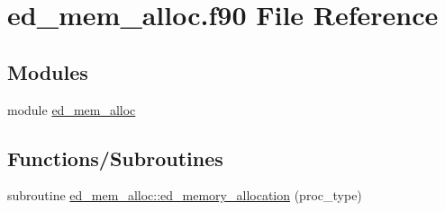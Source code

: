 \hypertarget{ed__mem__alloc_8f90}{}\section{ed\+\_\+mem\+\_\+alloc.\+f90 File Reference}
\label{ed__mem__alloc_8f90}
\subsection*{Modules}
\begin{DoxyCompactItemize}
\item 
module \hyperlink{namespaceed__mem__alloc}{ed\+\_\+mem\+\_\+alloc}
\end{DoxyCompactItemize}
\subsection*{Functions/\+Subroutines}
\begin{DoxyCompactItemize}
\item 
subroutine \hyperlink{namespaceed__mem__alloc_a410d759cf4e13ea20ace04982d91d9bb}{ed\+\_\+mem\+\_\+alloc\+::ed\+\_\+memory\+\_\+allocation} (proc\+\_\+type)
\end{DoxyCompactItemize}

